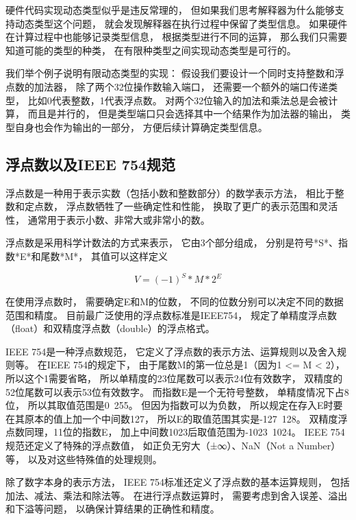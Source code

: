 硬件代码实现动态类型似乎是违反常理的，
但如果我们思考解释器为什么能够支持动态类型这个问题，
就会发现解释器在执行过程中保留了类型信息。
如果硬件在计算过程中也能够记录类型信息，
根据类型进行不同的运算，
那么我们只需要知道可能的类型的种类，
在有限种类型之间实现动态类型是可行的。

我们举个例子说明有限动态类型的实现：
假设我们要设计一个同时支持整数和浮点数的加法器，
除了两个32位操作数输入端口，
还需要一个额外的端口传递类型，
比如0代表整数，1代表浮点数。
对两个32位输入的加法和乘法总是会被计算，
而且是并行的，
但是类型端口只会选择其中一个结果作为加法器的输出，
类型自身也会作为输出的一部分，
方便后续计算确定类型信息。

\subsection{浮点数以及IEEE 754规范}

浮点数是一种用于表示实数（包括小数和整数部分）的数学表示方法，
相比于整数和定点数，
浮点数牺牲了一些确定性和性能，
换取了更广的表示范围和灵活性，
通常用于表示小数、非常大或非常小的数。

浮点数是采用科学计数法的方式来表示，
它由3个部分组成，
分别是符号*S*、指数*E*和尾数*M*，
其值可以这样定义

$$V =  (-1)^S * M * 2^E$$

在使用浮点数时，
需要确定E和M的位数，
不同的位数分别可以决定不同的数据范围和精度。
目前最广泛使用的浮点数标准是IEEE754，
规定了单精度浮点数（float）和双精度浮点数（double）的浮点格式。

IEEE 754是一种浮点数规范，
它定义了浮点数的表示方法、运算规则以及舍入规则等。
在IEEE 754的规定下，
由于尾数M的第一位总是1（因为1 <= M < 2），
所以这个1需要省略，
所以单精度的23位尾数可以表示24位有效数字，
双精度的52位尾数可以表示53位有效数字。
而指数E是一个无符号整数，
单精度情况下占8位，
所以其取值范围是0~255。
但因为指数可以为负数，
所以规定在存入E时要在其原本的值上加一个中间数127，
所以E的取值范围其实是-127~128。
双精度浮点数同理，11位的指数E，
加上中间数1023后取值范围为-1023~1024。
IEEE 754规范还定义了特殊的浮点数值，
如正负无穷大（±∞）、NaN（Not a Number）等，
以及对这些特殊值的处理规则。

除了数字本身的表示方法，
IEEE 754标准还定义了浮点数的基本运算规则，
包括加法、减法、乘法和除法等。
在进行浮点数运算时，
需要考虑到舍入误差、溢出和下溢等问题，
以确保计算结果的正确性和精度。